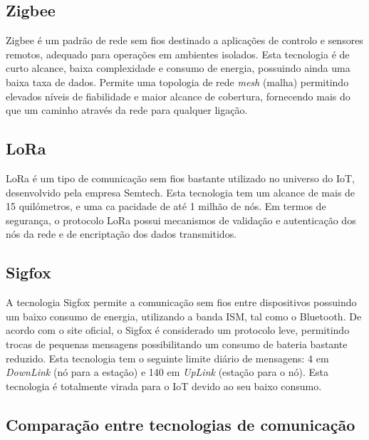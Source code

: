 \subsection{Zigbee}


Zigbee é um padrão de rede sem fios destinado a aplicações de controlo e sensores remotos, adequado para operações em ambientes isolados. Esta tecnologia é de curto alcance, baixa complexidade e consumo de energia, possuindo ainda uma baixa taxa de dados. Permite uma topologia de rede \textit{mesh} (malha) permitindo elevados níveis de fiabilidade e maior alcance de cobertura, fornecendo mais do que um caminho através da rede para qualquer ligação\cite{Rahman2015}. 


\subsection{LoRa}

\ac{LoRa} é um tipo de comunicação sem fios bastante utilizado no universo do \ac{IoT}, desenvolvido pela empresa Semtech. Esta tecnologia tem um alcance de mais de 15 quilómetros, e uma ca	pacidade de até 1 milhão de nós. Em termos de segurança, o protocolo LoRa possui mecanismos de validação e autenticação dos nós da rede e de encriptação dos dados transmitidos\cite{LinkLabs2015}\cite{Semtech2017}. 





\subsection{Sigfox}


A tecnologia Sigfox permite a comunicação sem fios entre dispositivos possuindo um baixo consumo de energia, utilizando a banda \ac{ISM}, tal como o Bluetooth. De acordo com o site oficial, o Sigfox é considerado um protocolo leve, permitindo trocas de pequenas mensagens possibilitando um consumo de bateria bastante reduzido. Esta tecnologia tem o seguinte limite diário de mensagens: 4 em \textit{DownLink} (nó para a estação) e 140 em \textit{UpLink} (estação para o nó)\cite{sigfoxsite}. Esta tecnologia é totalmente virada para o \ac{IoT} devido ao seu baixo consumo. 




\subsection{Comparação entre tecnologias de comunicação}

